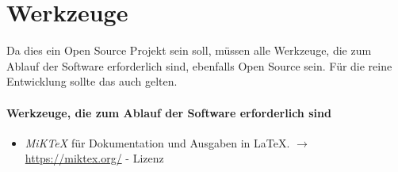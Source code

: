 \documentclass[english,ngerman,parskip=half,headsepline,footsepline]{scrreprt}
\newcounter{Enumi}
\begin{document}
	\thispagestyle{scrheadings}

	\section{Werkzeuge} %
	\label{sec:Werkzeuge}

	Da dies ein Open Source Projekt sein soll, müssen alle Werkzeuge, die zum Ablauf der Software erforderlich sind, ebenfalls Open Source sein. Für die reine Entwicklung sollte das auch gelten.

	\paragraph{Werkzeuge, die zum Ablauf der Software erforderlich sind}
	\begin{itemize}

		\item\label{Werkzeug:MiKTeX}\emph{MiK\TeX} für Dokumentation und Ausgaben in \LaTeX. $\rightarrow$ \url{https://miktex.org/} - Lizenz~\cite{bib:MiKTeX}

		\setcounter{Enumi}{\value{enumi}}
	\end{itemize}
\end{document}
